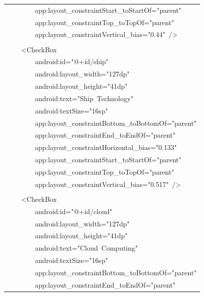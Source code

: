 \documentclass[a4paper,12pt]{article}
\begin{document}
\begin{longtable}{|p{}|}
{\ttfamily\small \ \ \ \ \ \ \ \ app:layout\_constraintStart\_toStartOf="parent"} \\
{\ttfamily\small \ \ \ \ \ \ \ \ app:layout\_constraintTop\_toTopOf="parent"} \\
{\ttfamily\small \ \ \ \ \ \ \ \ app:layout\_constraintVertical\_bias="0.44"\ /\textgreater{}} \\
\strut \\
{\ttfamily\small \ \ \ \ \textless{}CheckBox} \\
{\ttfamily\small \ \ \ \ \ \ \ \ android:id="@+id/ship"} \\
{\ttfamily\small \ \ \ \ \ \ \ \ android:layout\_width="127dp"} \\
{\ttfamily\small \ \ \ \ \ \ \ \ android:layout\_height="41dp"} \\
{\ttfamily\small \ \ \ \ \ \ \ \ android:text="Ship\ Technology"} \\
{\ttfamily\small \ \ \ \ \ \ \ \ android:textSize="16sp"} \\
{\ttfamily\small \ \ \ \ \ \ \ \ app:layout\_constraintBottom\_toBottomOf="parent"} \\
{\ttfamily\small \ \ \ \ \ \ \ \ app:layout\_constraintEnd\_toEndOf="parent"} \\
{\ttfamily\small \ \ \ \ \ \ \ \ app:layout\_constraintHorizontal\_bias="0.133"} \\
{\ttfamily\small \ \ \ \ \ \ \ \ app:layout\_constraintStart\_toStartOf="parent"} \\
{\ttfamily\small \ \ \ \ \ \ \ \ app:layout\_constraintTop\_toTopOf="parent"} \\
{\ttfamily\small \ \ \ \ \ \ \ \ app:layout\_constraintVertical\_bias="0.517"\ /\textgreater{}} \\
\strut \\
{\ttfamily\small \ \ \ \ \textless{}CheckBox} \\
{\ttfamily\small \ \ \ \ \ \ \ \ android:id="@+id/cloud"} \\
{\ttfamily\small \ \ \ \ \ \ \ \ android:layout\_width="127dp"} \\
{\ttfamily\small \ \ \ \ \ \ \ \ android:layout\_height="41dp"} \\
{\ttfamily\small \ \ \ \ \ \ \ \ android:text="Cloud\ Computing"} \\
{\ttfamily\small \ \ \ \ \ \ \ \ android:textSize="16sp"} \\
{\ttfamily\small \ \ \ \ \ \ \ \ app:layout\_constraintBottom\_toBottomOf="parent"} \\
{\ttfamily\small \ \ \ \ \ \ \ \ app:layout\_constraintEnd\_toEndOf="parent"} \\

\end{longtable}
\end{document}
